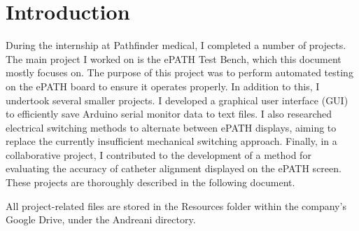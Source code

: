 \section{Introduction}
During the internship at Pathfinder medical, I completed a number of projects. The main project I worked on is the ePATH Test Bench, which this document mostly focuses on. The purpose of this project was to perform automated testing on the ePATH board to ensure it operates properly. In addition to this, I undertook several smaller projects. I developed a graphical user interface (GUI) to efficiently save Arduino serial monitor data to text files. I also researched electrical switching methods to alternate between ePATH displays, aiming to replace the currently insufficient mechanical switching approach. Finally, in a collaborative project, I contributed to the development of a method for evaluating the accuracy of catheter alignment displayed on the ePATH screen. These projects are thoroughly described in the following document.

All project-related files are stored in the Resources folder within the company’s Google Drive, under the Andreani directory.